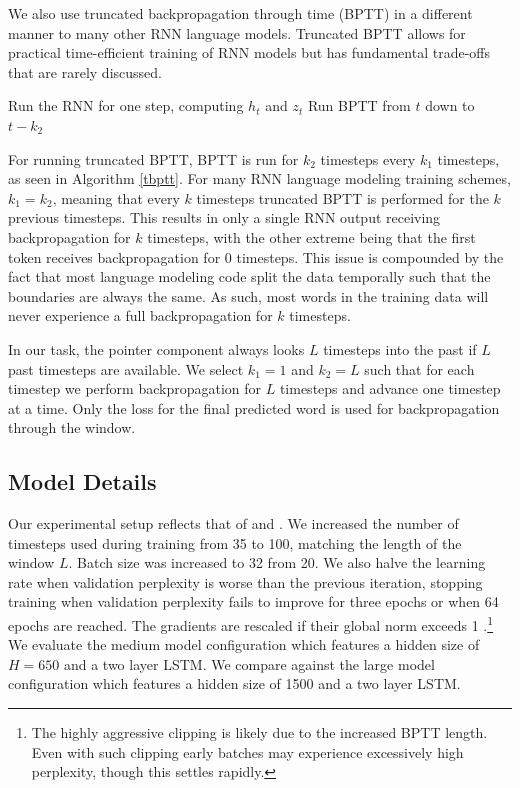 We also use truncated backpropagation through time (BPTT) in a different manner to many other RNN language models. Truncated BPTT allows for practical time-efficient training of RNN models but has fundamental trade-offs that are rarely discussed.

\begin{algorithm}[t!]
\caption{Calculate truncated BPTT where every $k_1$ timesteps we run back propagation for $k_2$ timesteps}
\label{tbptt}
\begin{algorithmic}
        \STATE Run the RNN for one step, computing $h_t$ and $z_t$
        \STATE {} \STATE Run BPTT from $t$ down to $t - k_2$ \ENDIF \ENDFOR
\end{algorithmic}
\end{algorithm}

For running truncated BPTT, BPTT is run for $k_2$ timesteps every $k_1$ timesteps, as seen in Algorithm \ref{tbptt}.
For many RNN language modeling training schemes, $k_1 = k_2$, meaning that every $k$ timesteps truncated BPTT is performed for the $k$ previous timesteps. This results in only a single RNN output receiving backpropagation for $k$ timesteps, with the other extreme being that the first token receives backpropagation for $0$ timesteps. This issue is compounded by the fact that most language modeling code split the data temporally such that the boundaries are always the same. As such, most words in the training data will never experience a full backpropagation for $k$ timesteps.

In our task, the pointer component always looks $L$ timesteps into the past if $L$ past timesteps are available. We select $k_1 = 1$ and $k_2 = L$ such that for each timestep we perform backpropagation for $L$ timesteps and advance one timestep at a time. Only the loss for the final predicted word is used for backpropagation through the window.

\subsection{Model Details} Our experimental setup reflects that of \citet{Zaremba2014} and \citet{Gal2015}.
We increased the number of timesteps used during training from 35 to 100, matching the length of the window $L$. Batch size was increased to 32 from 20. We also halve the learning rate when validation perplexity is worse than the previous iteration, stopping training when validation perplexity fails to improve for three epochs or when 64 epochs are reached. The gradients are rescaled if their global norm exceeds 1 \cite{Pascanu2013}.\footnote{The highly aggressive clipping is likely due to the increased BPTT length. Even with such clipping early batches may experience excessively high perplexity, though this settles rapidly.} We evaluate the medium model configuration which features a hidden size of $H=650$ and a two layer LSTM. We compare against the large model configuration which features a hidden size of 1500 and a two layer LSTM.

